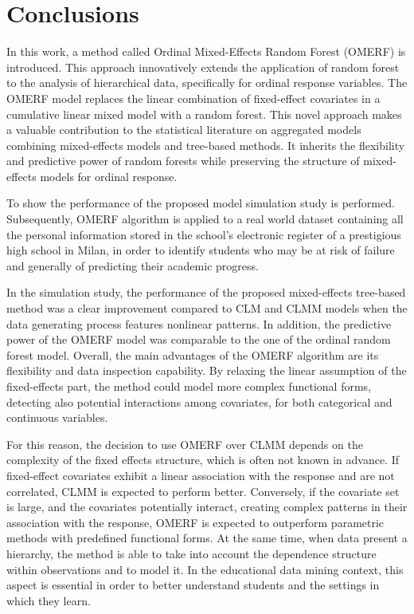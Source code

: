 \section{Conclusions}
\label{sec:conclusions}
\color{black}
In this work, a method called Ordinal Mixed-Effects Random Forest (OMERF) is introduced. 
This approach innovatively extends the application of random forest to the analysis of hierarchical data, specifically for ordinal response variables.
The OMERF model replaces the linear combination of fixed-effect covariates in a cumulative linear mixed model with a random forest.
This novel approach makes a valuable contribution to the statistical literature on aggregated models combining mixed-effects models and tree-based methods.
It inherits the flexibility and predictive power of random forests while preserving the structure of mixed-effects models for ordinal response.

To show the performance of the proposed model simulation study is performed. Subsequently, OMERF algorithm is applied to a real world dataset containing  all the personal information stored in the school's electronic register of a prestigious high school in Milan, in order to identify students who may be at risk of failure and generally of predicting their academic progress.

In the simulation study, the performance of the proposed mixed-effects tree-based method was a clear improvement compared to CLM and CLMM models when the data generating process features nonlinear patterns.
In addition, the predictive power of the OMERF model was comparable to the one of the ordinal random forest model.
Overall, the main advantages of the OMERF algorithm are its flexibility and data inspection capability.
By relaxing the linear assumption of the fixed-effects part, the method could model more complex functional forms, detecting also potential interactions
among covariates, for both categorical and continuous variables.

For this reason, the decision to use OMERF over CLMM depends on the complexity of the fixed effects structure, which is often not known in advance.
If fixed-effect covariates exhibit a linear association with the response and are not correlated, CLMM is expected to perform better.
Conversely, if the covariate set is large, and the covariates potentially interact, creating complex patterns in their association with the response, OMERF is expected to outperform parametric methods with predefined functional forms.
At the same time, when data present a hierarchy, the method is able to take into account the dependence structure within observations and to model it.
In the educational data mining context, this aspect is essential in order to better understand students and the settings in which they learn.

